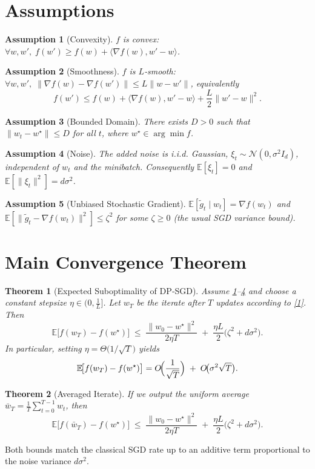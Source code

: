 \documentclass{article}
\newtheorem{theorem}{Theorem}
\newtheorem{assumption}{Assumption}
\newcommand{\E}{\mathbb{E}}
\begin{document}
\section*{Assumptions}
\begin{assumption}[Convexity]\label{ass:convex}
$f$ is convex: $\forall w,w',\; f(w')\ge f(w)+\langle\nabla f(w),w'-w\rangle$.
\end{assumption}
\begin{assumption}[Smoothness]\label{ass:smooth}
$f$ is $L$‑smooth: $\forall w,w',\;
\|\nabla f(w)-\nabla f(w')\|\le L\|w-w'\|$,
equivalently
\[
f(w')\le f(w)+\langle\nabla f(w),w'-w\rangle+\frac{L}{2}\|w'-w\|^2.
\]
\end{assumption}
\begin{assumption}[Bounded Domain]\label{ass:bounded}
There exists $D>0$ such that $\|w_t-w^\star\|\le D$ for all $t$, where
$w^\star\in\arg\min f$.
\end{assumption}
\begin{assumption}[Noise]\label{ass:noise}
The added noise is i.i.d. Gaussian,
$\xi_t\sim\mathcal N(0,\sigma^2 I_d)$, independent of $w_t$ and the minibatch.
Consequently $\E[\xi_t]=0$ and $\E[\|\xi_t\|^2]=d\sigma^2$.
\end{assumption}
\begin{assumption}[Unbiased Stochastic Gradient]\label{ass:unbiased}
$\E[\tilde g_t\mid w_t]=\nabla f(w_t)$ and $\E[\|\tilde g_t-\nabla f(w_t)\|^2]\le \zeta^2$
for some $\zeta\ge0$ (the usual SGD variance bound).
\end{assumption}

\section*{Main Convergence Theorem}
\begin{theorem}[Expected Suboptimality of DP‑SGD]\label{thm:main}
Assume \ref{ass:convex}–\ref{ass:noise} and choose a constant stepsize
$\eta\in(0,\tfrac{1}{L}]$. Let $w_T$ be the iterate after $T$ updates
according to \eqref{1}. Then
\[
\E\!\bigl[f(w_T)-f(w^\star)\bigr]
\;\le\;
\frac{\|w_0-w^\star\|^2}{2\eta T}
\;+\;
\frac{\eta L}{2}\bigl(\zeta^2+d\sigma^2\bigr).
\tag{2}
\]
In particular, setting $\eta=\Theta\!\bigl(1/\sqrt{T}\bigr)$ yields
\[
\E\!\bigl[f(w_T)-f(w^\star)\bigr]=O\!\Bigl(\frac{1}{\sqrt{T}}\Bigr)
\;+\;O\!\bigl(\sigma^2\sqrt{T}\bigr).
\]
\end{theorem}
\begin{theorem}[Averaged Iterate]\label{thm:avg}
If we output the uniform average $\bar w_T=\frac{1}{T}\sum_{t=0}^{T-1}w_t$, then
\[
\E\!\bigl[f(\bar w_T)-f(w^\star)\bigr]
\;\le\;
\frac{\|w_0-w^\star\|^2}{2\eta T}
\;+\;
\frac{\eta L}{2}\bigl(\zeta^2+d\sigma^2\bigr).
\tag{3}
\]
\end{theorem}
Both bounds match the classical SGD rate up to an additive term
proportional to the noise variance $d\sigma^2$.
\end{document}
